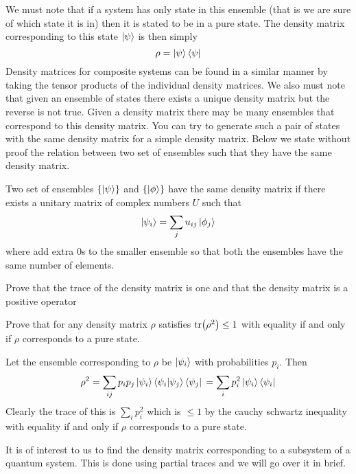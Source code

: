 We must note that if a system has only state in this ensemble (that is we are sure of which state it is in) then it  is stated to be in a pure state. The density matrix corresponding to this state $\ket{\psi}$ is then simply
$$\rho = \ket{\psi}\bra{\psi}$$
Density matrices for composite systems can be found in a similar manner by taking the tensor products of the individual density matrices. We also must note that given an ensemble of states there exists a unique density matrix but the reverse is not true. Given a density matrix there may be many ensembles that correspond to this density matrix. You can try to generate such a pair of states with the same density matrix for a simple density matrix.
Below we state without proof the relation between two set of ensembles such that they have the same density matrix.
\begin{theorem}
Two set of ensembles $\{ \ket{\psi} \}$ and $\{ \ket{\phi} \}$ have the same density matrix if there exists a unitary matrix of complex numbers $U$ such that 
$$\ket{\psi_i} = \sum_j u_{ij} \ket{\phi_j}$$ where add extra 0s to the smaller ensemble so that both the ensembles have the same number of elements.

\end{theorem}

\begin{exercise}
Prove that the trace of the density matrix is one and that the density matrix is a positive operator
\end{exercise}

\begin{exercise}
Prove that for any density matrix $\rho$ satisfies $\tr(\rho^{2}) \leq 1$ with equality if and only if $\rho$ corresponds to a pure state.
\end{exercise}
\begin{solution}
Let the ensemble corresponding to $\rho$ be $\ket{\psi_i}$ with probabilities $p_i$. Then
$$ \rho^{2} = \sum_{ij} p_i p_j \ket{\psi_i}\braket{\psi_i}{\psi_j}\bra{\psi_j} \\ = \sum_i p_i^{2} \ket{\psi_i}\bra{\psi_i}$$
Clearly the trace of this is $\sum_i p_i^{2}$ which is $\leq 1$ by the cauchy schwartz inequality with equality if and only if $\rho$ corresponds to a pure state.

\end{solution}

It is of interest to us to find the density matrix corresponding to a subsystem of a quantum system. This is done using partial traces and we will go over it in brief.

